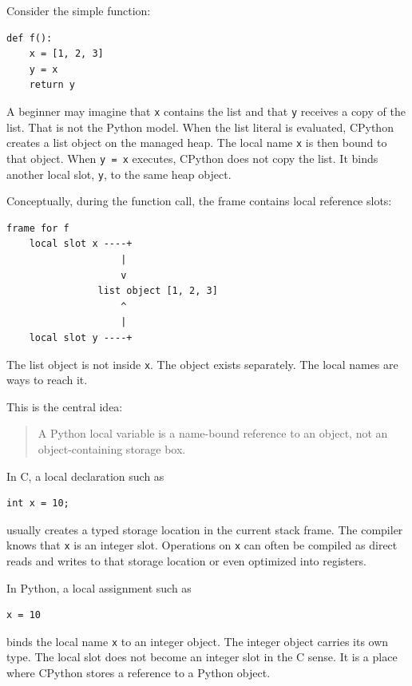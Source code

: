 Consider the simple function:

\begin{verbatim}
def f():
    x = [1, 2, 3]
    y = x
    return y
\end{verbatim}

A beginner may imagine that \texttt{x} contains the list and that \texttt{y} receives a copy of the list. That is not the Python model. When the list literal is evaluated, CPython creates a list object on the managed heap. The local name \texttt{x} is then bound to that object. When \texttt{y = x} executes, CPython does not copy the list. It binds another local slot, \texttt{y}, to the same heap object.

Conceptually, during the function call, the frame contains local reference slots:

\begin{verbatim}
frame for f
    local slot x ----+
                    |
                    v
                list object [1, 2, 3]
                    ^
                    |
    local slot y ----+
\end{verbatim}

The list object is not inside \texttt{x}. The object exists separately. The local names are ways to reach it.

This is the central idea:

\begin{quote}
A Python local variable is a name-bound reference to an object, not an object-containing storage box.
\end{quote}

In C, a local declaration such as

\begin{verbatim}
int x = 10;
\end{verbatim}

usually creates a typed storage location in the current stack frame. The compiler knows that \texttt{x} is an integer slot. Operations on \texttt{x} can often be compiled as direct reads and writes to that storage location or even optimized into registers.

In Python, a local assignment such as

\begin{verbatim}
x = 10
\end{verbatim}

binds the local name \texttt{x} to an integer object. The integer object carries its own type. The local slot does not become an integer slot in the C sense. It is a place where CPython stores a reference to a Python object.

